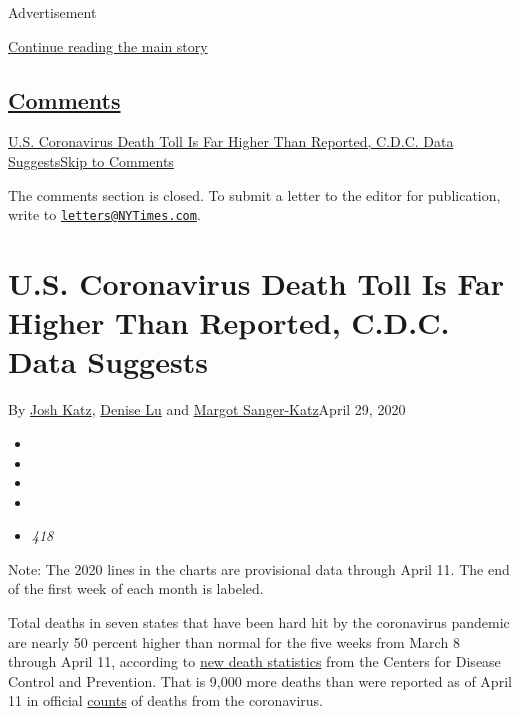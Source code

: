 Advertisement

\protect\hyperlink{after-top}{Continue reading the main story}

\hypertarget{comments}{%
\subsection{\texorpdfstring{\protect\hyperlink{commentsContainer}{Comments}}{Comments}}\label{comments}}

\href{}{U.S. Coronavirus Death Toll Is Far Higher Than Reported, C.D.C.
Data Suggests}\href{}{Skip to Comments}

The comments section is closed. To submit a letter to the editor for
publication, write to
\href{mailto:letters@NYTimes.com}{\nolinkurl{letters@NYTimes.com}}.

\hypertarget{us-coronavirus-death-toll-is-far-higher-than-reported-cdc-data-suggests}{%
\section{U.S. Coronavirus Death Toll Is Far Higher Than Reported, C.D.C.
Data
Suggests}\label{us-coronavirus-death-toll-is-far-higher-than-reported-cdc-data-suggests}}

By \href{https://www.nytimes3xbfgragh.onion/by/josh-katz}{Josh Katz},
\href{https://www.nytimes3xbfgragh.onion/by/denise-lu}{Denise Lu} and
\href{https://www.nytimes3xbfgragh.onion/by/margot-sanger-katz}{Margot
Sanger-Katz}April 29, 2020

\begin{itemize}
\item
\item
\item
\item
\item
  \emph{418}
\end{itemize}

Note: The 2020 lines in the charts are provisional data through April
11. The end of the first week of each month is labeled.

Total deaths in seven states that have been hard hit by the coronavirus
pandemic are nearly 50 percent higher than normal for the five weeks
from March 8 through April 11, according to
\href{https://www.cdc.gov/nchs/nvss/vsrr/covid_weekly/}{new death
statistics} from the Centers for Disease Control and Prevention. That is
9,000 more deaths than were reported as of April 11 in official
\href{https://www.nytimes3xbfgragh.onion/interactive/2020/us/coronavirus-us-cases.html}{counts}
of deaths from the coronavirus.

